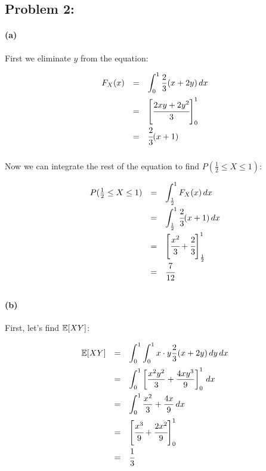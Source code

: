 \documentclass[a4paper]{article}
\begin{document}
\subsection*{Problem 2:}

\paragraph{(a)}

First we eliminate $y$ from the equation:

\begin{equation}
\begin{array}{rll}
F_X(x) & = & \displaystyle\int^1_{0} \frac{2}{3}(x+2y) \,dx \\[.15in]
& = & \left[ \cfrac{2xy+2y^2}{3} \right]^1_0 \\[.15in]
& = & \cfrac{2}{3}(x+1) \\[.15in]
\end{array}
\end{equation}

Now we can integrate the rest of the equation to find $P(\frac{1}{2} \le X \le 1)$:

\begin{equation}
\begin{array}{rll}
P(\frac{1}{2} \le X \le 1) & = & \displaystyle\int^1_{\frac{1}{2}}F_X(x) \,dx \\[.15in]
& = & \displaystyle\int^1_{\frac{1}{2}} \cfrac{2}{3}(x+1) \,dx \\[.15in]
& = & \left[ \cfrac{x^2}{3}+ \cfrac{2}{3} \right]^1_{\frac{1}{2}} \\[.15in]
& = & \cfrac{7}{12} \\[.15in]
\end{array}
\end{equation}

\paragraph{(b)}

First, let's find $\mathbb{E}[XY]$:

\begin{equation}
\begin{array}{rll}
\mathbb{E}[XY] & = & \displaystyle\int^1_{0} \int^1_{0} x \cdot y \frac{2}{3}(x+2y) \,dy  \,dx \\[.15in]
& = & \displaystyle\int^1_{0} \left[ \frac{x^2 y^2}{3} + \frac{4x y^3}{9} \right]^1_0 \,dx \\[.15in]
& = & \displaystyle\int^1_{0} \frac{x^2}{3} + \frac{4x}{9} \,dx \\[.15in]
& = & \left[ \cfrac{x^3}{9} + \cfrac{2x^2}{9} \right]^1_0 \\[.15in]
& = & \cfrac{1}{3} \\[.15in]
\end{array}
\end{equation}
\end{document}
